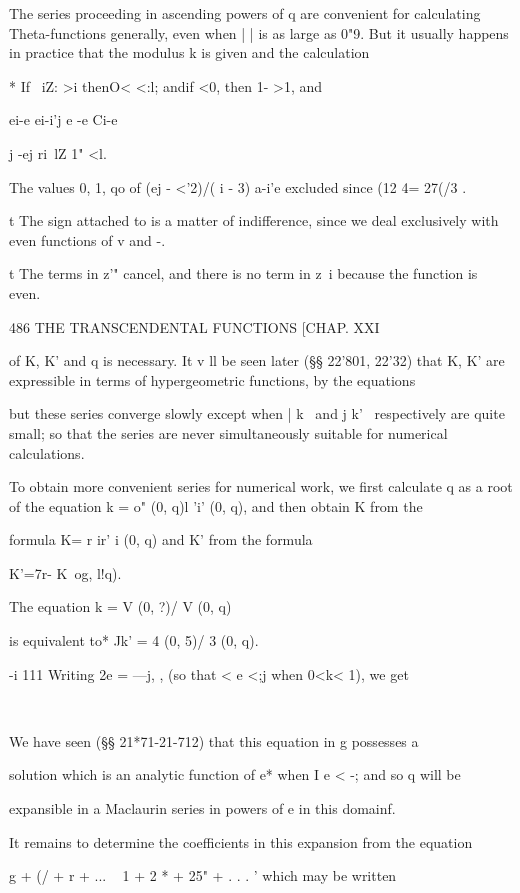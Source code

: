 The series proceeding in ascending powers of q are convenient for
calculating Theta-functions generally, even when | | is as large as
0"9. But it usually happens in practice that the modulus k is given
and the calculation

* If \ iZ: >i thenO< <:l; andif <0, then 1- >1, and

ei-e ei-i'j e -e Ci-e

 j -ej ri\ lZ 1" <l.

The values 0, 1, qo of (ej - <'2)/( i - 3) a-i'e excluded since (12 4=
27(/3 .

t The sign attached to is a matter of indifference, since we deal
exclusively with even functions of v and -.

t The terms in z'" cancel, and there is no term in z~i because the
function is even.

486 THE TRANSCENDENTAL FUNCTIONS [CHAP. XXI

of K, K' and q is necessary. It v ll be seen later (§§ 22'801, 22'32)
that K, K' are expressible in terms of hypergeometric functions, by
the equations

but these series converge slowly except when | k \ and j k' \
respectively are quite small; so that the series are never
simultaneously suitable for numerical calculations.

To obtain more convenient series for numerical work, we first
calculate q as a root of the equation k = o" (0, q)l 'i' (0, q), and
then obtain K from the

formula K= r ir' i (0, q) and K' from the formula

K'=7r- K\ og, l!q).

The equation k = V (0, ?)/ V (0, q)

is equivalent to* Jk' = 4 (0, 5)/ 3 (0, q).

-i 111 Writing 2e = —j, , (so that < e <;j when 0<k< 1), we get

\ %

We have seen (§§ 21*71-21-712) that this equation in g possesses a

solution which is an analytic function of e* when I e < -; and so q
will be

expansible in a Maclaurin series in powers of e in this domainf.

It remains to determine the coefficients in this expansion from the
equation

g + (/ + r + ... ~ 1 + 2 * + 25" + . . . ' which may be written

